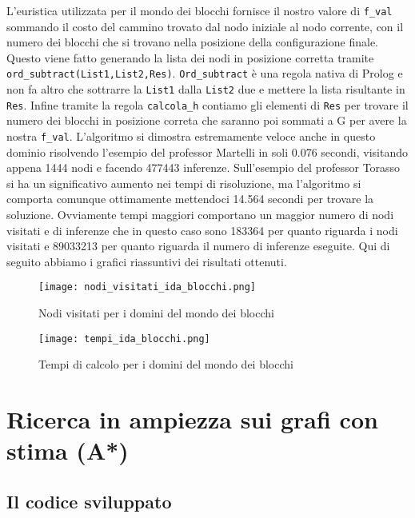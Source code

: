 L'euristica utilizzata per il mondo dei blocchi fornisce il nostro valore di \lstinline{f_val} sommando il costo del cammino trovato dal nodo iniziale al nodo corrente, con il numero dei blocchi che si trovano nella posizione della configurazione finale. Questo viene fatto generando la lista dei nodi in posizione corretta tramite \lstinline{ord_subtract(List1,List2,Res)}. \lstinline{Ord_subtract} è una regola nativa di Prolog e non fa altro che sottrarre la \lstinline{List1} dalla \lstinline{List2} due e mettere la lista risultante in \lstinline{Res}. Infine tramite la regola \lstinline{calcola_h} contiamo gli elementi di \lstinline{Res} per trovare il numero dei blocchi in posizione correta che saranno poi sommati a G per avere la nostra \lstinline{f_val}. L'algoritmo si dimostra estremamente veloce anche in questo dominio risolvendo l'esempio del professor Martelli in soli 0.076 secondi, visitando appena 1444 nodi e facendo 477443 inferenze. Sull'esempio del professor Torasso si ha un significativo aumento nei tempi di risoluzione, ma l'algoritmo si comporta comunque ottimamente mettendoci 14.564 secondi per trovare la soluzione. Ovviamente tempi maggiori comportano un maggior numero di nodi visitati e di inferenze che in questo caso sono 183364 per quanto riguarda i nodi visitati e 89033213 per quanto riguarda il numero di inferenze eseguite.
Qui di seguito abbiamo i grafici riassuntivi dei risultati ottenuti.

\begin{figure}[htp]
  \texttt{[image: nodi\_visitati\_ida\_blocchi.png]}
  \caption{Nodi visitati per i domini del mondo dei blocchi}
  \label{fig:figure11}
\end{figure}

\begin{figure}[htp]
  \texttt{[image: tempi\_ida\_blocchi.png]}
  \caption{Tempi di calcolo per i domini del mondo dei blocchi}
  \label{fig:figure12}
\end{figure}

\newpage
\section{Ricerca in ampiezza sui grafi con stima (A*)}

\subsection{Il codice sviluppato}

